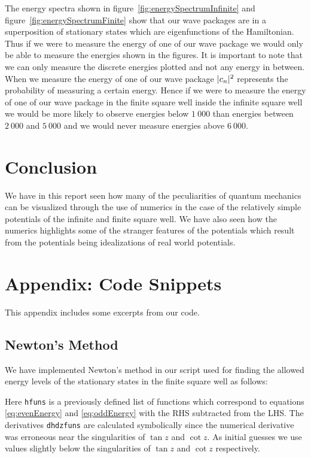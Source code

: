 \documentclass[12pt,a4paper]{article}
\DeclarePairedDelimiter{\abs}{\lvert}{\rvert}
\begin{document}
The energy spectra shown in figure~\ref{fig:energySpectrumInfinite} and figure~\ref{fig:energySpectrumFinite} show that our wave packages are in a superposition of stationary states which are eigenfunctions of the Hamiltonian. Thus if we were to measure the energy of one of our wave package we would only be able to measure the energies shown in the figures. It is important to note that we can only measure the discrete energies plotted and not any energy in between. When we measure the energy of one of our wave package $\abs{c_n}^2$ represents the probability of measuring a certain energy. Hence if we were to measure the energy of one of our wave package in the finite square well inside the infinite square well we would be more likely to observe energies below $1~000$ than energies between $2~000$ and $5~000$ and we would never measure energies above $6~000$.

\section{Conclusion}
We have in this report seen how many of the peculiarities of quantum mechanics can be visualized through the use of numerics in the case of the relatively simple potentials of the infinite and finite square well. We have also seen how the numerics highlights some of the stranger features of the potentials which result from the potentials being idealizations of real world potentials.

\newpage
\appendix
\section{Appendix: Code Snippets}
This appendix includes some excerpts from our code.
\subsection{Newton's Method} \label{app:newton}
We have implemented Newton's method in our script used for finding the allowed energy levels of the stationary states in the finite square well as follows:

Here \lstinline{hfuns} is a previously defined list of functions which correspond to equations \eqref{eq:evenEnergy} and \eqref{eq:oddEnergy} with the RHS subtracted from the LHS. The derivatives \lstinline{dhdzfuns} are calculated symbolically since the numerical derivative was erroneous near the singularities of $\tan z$ and $\cot z$. As initial guesses we use values slightly below the singularities of $\tan z$ and $\cot z$ respectively.
\end{document}
